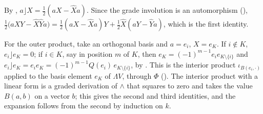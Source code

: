 By , $a \rfloor X = \tfrac12(aX - \hat{X} a)$. Since the grade involution is an automorphism (), $\tfrac12\bigl(aXY - \hat{X}\hat{Y}a\bigr) = \tfrac12(aX - \hat{X}a)Y + \tfrac12\hat{X}(aY - \hat{Y}a)$, which is the first identity.

For the outer product, take an orthogonal basis and $a = e_i$, $X = e_K$. If $i \notin K$, $e_i \rfloor e_K = 0$; if $i \in K$, say in position $m$ of $K$, then $e_K = (-1)^{m-1} e_i e_{K \setminus \{i\}}$ and $e_i \rfloor e_K = e_i e_K = (-1)^{m-1} Q(e_i)\, e_{K \setminus \{i\}}$, by . This is the interior product $\iota_{B(e_i, \cdot)}$ applied to the basis element $e_K$ of $\Lambda V$, through $\Phi$ (). The interior product with a linear form is a graded derivation of $\wedge$ that squares to zero and takes the value $B(a, b)$ on a vector $b$; this gives the second and third identities, and the expansion follows from the second by induction on $k$.
